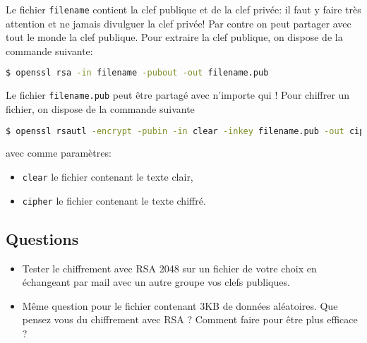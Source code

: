 \documentclass{article}
\begin{document}
Le fichier \texttt{filename} contient la clef publique et de la clef privée: il faut y faire très attention et
ne jamais divulguer la clef privée! Par contre on peut partager avec tout le monde la clef publique.
Pour extraire la clef publique, on dispose de la commande suivante:
\begin{lstlisting}[language=bash]
$ openssl rsa -in filename -pubout -out filename.pub
\end{lstlisting}

Le fichier \texttt{filename.pub} peut être partagé avec n’importe qui !
Pour chiffrer un fichier, on dispose de la commande suivante

\begin{lstlisting}[language=bash]
$ openssl rsautl -encrypt -pubin -in clear -inkey filename.pub -out cipher
\end{lstlisting}

avec comme paramètres:
\begin{itemize}
\item \texttt{clear} le fichier contenant le texte clair,
\item \texttt{cipher} le fichier contenant le texte chiffré.
\end{itemize}

\subsection*{Questions}
\begin{itemize}
\item Tester le chiffrement avec RSA 2048 sur un fichier de votre choix en échangeant par mail avec
un autre groupe vos clefs publiques.
\item Même question pour le fichier contenant 3KB de données aléatoires. Que pensez vous du chiffrement avec RSA ? Comment faire pour être plus efficace ?
\end{itemize}
\end{document}
